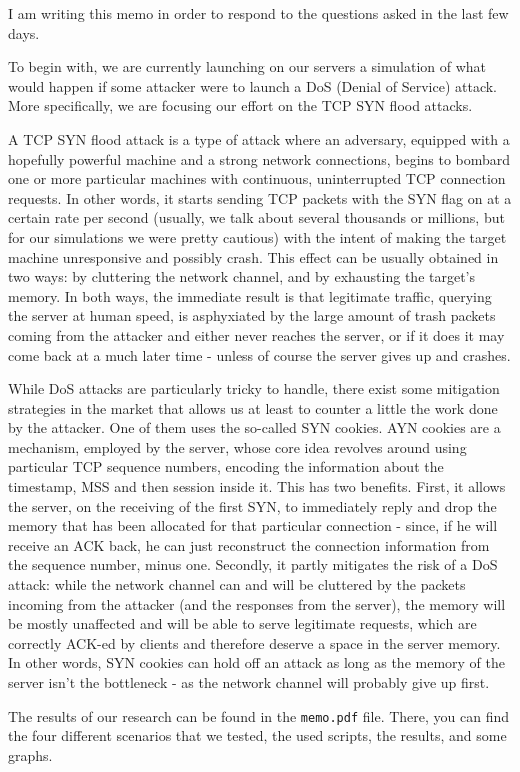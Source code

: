\documentclass[paper=a4]{../../_global/texMemo}
\begin{document}
\maketitle

I am writing this memo in order to respond to the questions asked in the last few days.

To begin with, we are currently launching on our servers a simulation of what would happen if some attacker were to launch a DoS (Denial of Service) attack. More specifically, we are focusing our effort on the TCP SYN flood attacks.

A TCP SYN flood attack is a type of attack where an adversary, equipped with a hopefully powerful machine and a strong network connections, begins to bombard one or more particular machines with continuous, uninterrupted TCP connection requests. In other words, it starts sending TCP packets with the SYN flag on at a certain rate per second (usually, we talk about several thousands or millions, but for our simulations we were pretty cautious) with the intent of making the target machine unresponsive and possibly crash. This effect can be usually obtained in two ways: by cluttering the network channel, and by exhausting the target's memory. In both ways, the immediate result is that legitimate traffic, querying the server at human speed, is asphyxiated by the large amount of trash packets coming from the attacker and either never reaches the server, or if it does it may come back at a much later time - unless of course the server gives up and crashes.

While DoS attacks are particularly tricky to handle, there exist some mitigation strategies in the market that allows us at least to counter a little the work done by the attacker. One of them uses the so-called SYN cookies. AYN cookies are a mechanism, employed by the server, whose core idea revolves around using particular TCP sequence numbers, encoding the information about the timestamp, MSS and then session inside it. This has two benefits. First, it allows the server, on the receiving of the first SYN, to immediately reply and drop the memory that has been allocated for that particular connection - since, if he will receive an ACK back, he can just reconstruct the connection information from the sequence number, minus one. Secondly, it partly mitigates the risk of a DoS attack: while the network channel can and will be cluttered by the packets incoming from the attacker (and the responses from the server), the memory will be mostly unaffected and will be able to serve legitimate requests, which are correctly ACK-ed by clients and therefore deserve a space in the server memory. In other words, SYN cookies can hold off an attack as long as the memory of the server isn't the bottleneck - as the network channel will probably give up first.

The results of our research can be found in the \verb=memo.pdf= file. There, you can find the four different scenarios that we tested, the used scripts, the results, and some graphs.
\end{document}

